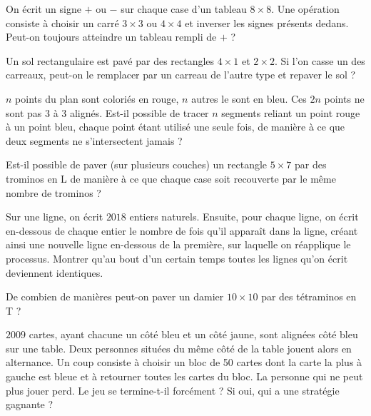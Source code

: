 \begin{exo}
On écrit un signe $+$ ou $-$ sur chaque case d'un tableau $8 \times 8$. Une opération consiste à choisir un carré $3 \times 3$ ou $4 \times 4$ et inverser les signes présents dedans. Peut-on toujours atteindre un tableau rempli de $+$ ?
\end{exo}


\begin{exo}
Un sol rectangulaire est pavé par des rectangles $4 \times 1$ et $2 \times 2$. Si l'on casse un des carreaux, peut-on le remplacer par un carreau de l'autre type et repaver le sol ?
\end{exo}


\begin{exo}
$n$ points du plan sont coloriés en rouge, $n$ autres le sont en bleu. Ces $2n$ points ne sont pas $3$ à $3$ alignés. Est-il possible de tracer $n$ segments reliant un point rouge à un point bleu, chaque point étant utilisé une seule fois, de manière à ce que deux segments ne s'intersectent jamais ?
\end{exo}


\begin{exo}
Est-il possible de paver (sur plusieurs couches) un rectangle $5 \times 7$ par des trominos en L de manière à ce que chaque case soit recouverte par le même nombre de trominos ?
\end{exo}


\begin{exo}
Sur une ligne, on écrit $2018$ entiers naturels. Ensuite, pour chaque ligne, on écrit en-dessous de chaque entier le nombre de fois qu'il apparaît dans la ligne, créant ainsi une nouvelle ligne en-dessous de la première, sur laquelle on réapplique le processus. Montrer qu'au bout d'un certain temps toutes les lignes qu'on écrit deviennent identiques.
\end{exo}


\begin{exo}
De combien de manières peut-on paver un damier $10 \times 10$ par des tétraminos en T ?
\end{exo}


\begin{exo}
$2009$ cartes, ayant chacune un côté bleu et un côté jaune, sont alignées côté bleu sur une table. Deux personnes situées du même côté de la table jouent alors en alternance. Un coup consiste à choisir un bloc de 50 cartes dont la carte la plus à gauche est bleue et à retourner toutes les cartes du bloc. La personne qui ne peut plus jouer perd. Le jeu se termine-t-il forcément ? Si oui, qui a une stratégie gagnante ?
\end{exo}

